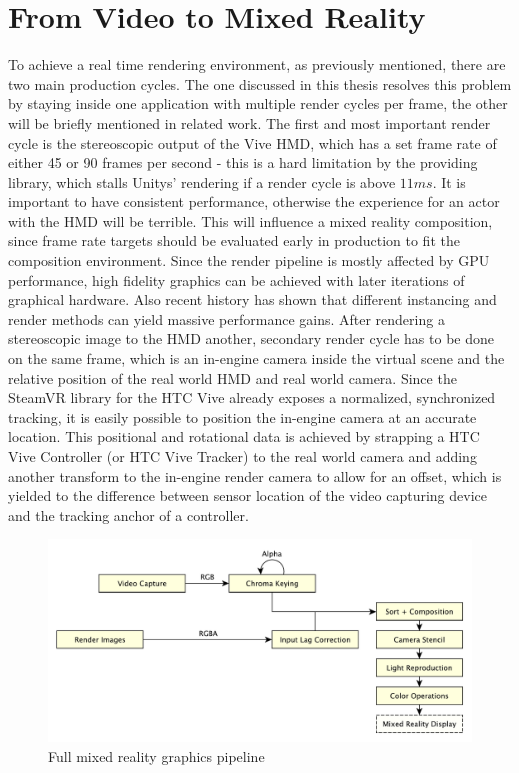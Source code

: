 %
\chapter{From Video to Mixed Reality}
\label{chap:video2mr}


To achieve a real time rendering environment, as previously mentioned, there 
are two main production cycles. The one discussed in this thesis resolves this 
problem by staying inside one application with multiple render cycles per 
frame, the other will be briefly mentioned in related work. 
\newline
The first and most important render cycle is the stereoscopic output of the 
Vive HMD, which has a set frame rate of either 45 or 90 frames per second - 
this is a hard limitation by the providing library, which stalls Unitys' 
rendering if a render cycle is above $11ms$. It is important to have consistent 
performance, otherwise the experience for an actor with the HMD will be 
terrible. This will influence a mixed reality composition, since frame rate 
targets should be evaluated early in production to fit the composition 
environment. Since the render pipeline is mostly affected by GPU performance, 
high fidelity graphics can be achieved with later iterations of graphical 
hardware. Also recent history has shown that different instancing and render 
methods can yield massive performance gains.
\newline
After rendering a stereoscopic image to the HMD another, secondary render cycle 
has to be done on the same frame, which is an in-engine camera inside the 
virtual scene and the relative position of the real world HMD and real world 
camera. Since the SteamVR library for the HTC Vive already exposes a 
normalized, synchronized tracking, it is easily possible to position the 
in-engine camera at an accurate location. This positional and rotational data 
is achieved by strapping a HTC Vive Controller (or HTC Vive Tracker) to the 
real world camera and adding another transform to the in-engine render camera 
to allow for an offset, which is yielded to the difference between sensor 
location of the video capturing device and the tracking anchor of a controller.

\begin{figure}[htb]
	\includegraphics[width=\textwidth]{_raw_resources/pipeline_steps/4_0_pipeline.pdf}
	\caption{Full mixed reality graphics pipeline}
	\label{fig:steps:pipeline}
\end{figure}


